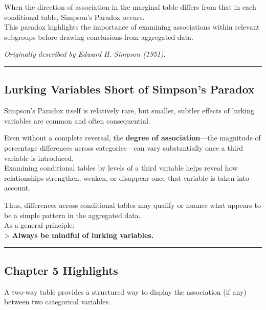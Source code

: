 \documentclass[
  letterpaper,
  DIV=11,
  numbers=noendperiod]{scrreprt}
\begin{document}
When the direction of association in the marginal table differs from
that in each conditional table, Simpson's Paradox occurs.\\
This paradox highlights the importance of examining associations within
relevant subgroups before drawing conclusions from aggregated data.

\emph{Originally described by Edward H. Simpson (1951).}

\begin{center}\rule{0.5\linewidth}{0.5pt}\end{center}

\subsection{Lurking Variables Short of Simpson's
Paradox}\label{lurking-variables-short-of-simpsons-paradox}

Simpson's Paradox itself is relatively rare, but smaller, subtler
effects of lurking variables are common and often consequential.

Even without a complete reversal, the \textbf{degree of
association}---the magnitude of percentage differences across
categories---can vary substantially once a third variable is
introduced.\\
Examining conditional tables by levels of a third variable helps reveal
how relationships strengthen, weaken, or disappear once that variable is
taken into account.

Thus, differences across conditional tables may qualify or nuance what
appears to be a simple pattern in the aggregated data.\\
As a general principle:\\
\textgreater{} \textbf{Always be mindful of lurking variables.}

\begin{center}\rule{0.5\linewidth}{0.5pt}\end{center}

\subsection{Chapter 5 Highlights}\label{chapter-5-highlights}

A two-way table provides a structured way to display the association (if
any) between two categorical variables.
\end{document}
